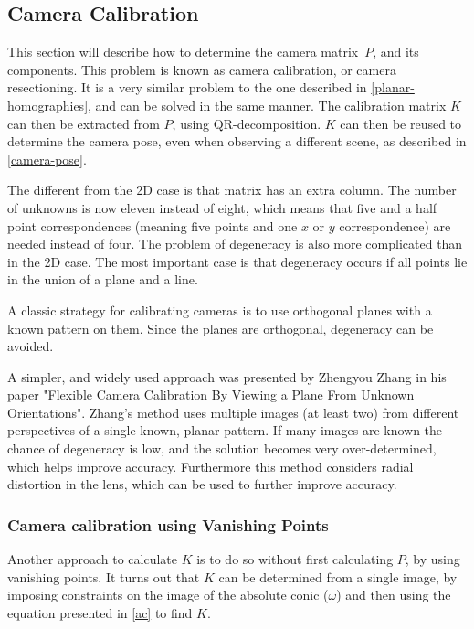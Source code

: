 \subsection{Camera Calibration} \label{camera-calibration}
This section will describe how to determine the camera matrix $P$, and its components.
This problem is known as camera calibration, or camera resectioning.
It is a very similar problem to the one described in \ref{planar-homographies}, and can be solved in the same manner.	
The calibration matrix $K$ can then be extracted from $P$, using QR-decomposition.\cite{wiki:qr-decomposition}
$K$ can then be reused to determine the camera pose, even when observing a different scene, as described in \ref{camera-pose}.

The different from the 2D case is that matrix has an extra column. The number of unknowns is now eleven instead of eight, which means that five and a half point correspondences (meaning five points and one $x$ or $y$ correspondence) are needed instead of four.
The problem of degeneracy is also more complicated than in the 2D case.
The most important case is that degeneracy occurs if all points lie in the union of a plane and a line. \cite[179-180]{hartley-zisserman}

A classic strategy for calibrating cameras is to use orthogonal planes with a known pattern on them. 
Since the planes are orthogonal, degeneracy can be avoided.

A simpler, and widely used approach was presented by Zhengyou Zhang in his paper "Flexible Camera Calibration By Viewing a Plane From Unknown Orientations".
Zhang's method uses multiple images (at least two) from different perspectives of a single known, planar pattern.
If many images are known the chance of degeneracy is low, and  the solution becomes very over-determined, which helps improve accuracy.
Furthermore this method considers radial distortion in the lens, which can be used to further improve accuracy. \cite{zhang-calibration}

\subsubsection{Camera calibration using Vanishing Points}
Another approach to calculate $K$ is to do so without first calculating $P$, by using vanishing points.
It turns out that $K$ can be determined from a single image, by imposing constraints on the image of the absolute conic ($\omega$) and then using the equation presented in \ref{ac} to find $K$.


